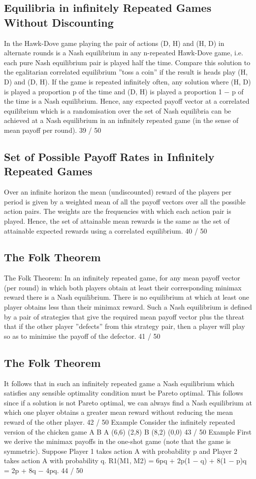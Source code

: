 \documentclass[]{report}
\begin{document}
\subsection{Equilibria in infinitely Repeated Games Without Discounting}
In the Hawk-Dove game playing the pair of actions (D, H) and
(H, D) in alternate rounds is a Nash equilibrium in any n-repeated
Hawk-Dove game, i.e. each pure Nash equilibrium pair is played
half the time.
Compare this solution to the egalitarian correlated equilibrium
”toss a coin” if the result is heads play (H, D) and (D, H).
If the game is repeated infinitely often, any solution where (H, D)
is played a proportion p of the time and (D, H) is played a
proportion 1 − p of the time is a Nash equilibrium.
Hence, any expected payoff vector at a correlated equilibrium
which is a randomisation over the set of Nash equilibria can be
achieved at a Nash equilibrium in an infinitely repeated game (in
the sense of mean payoff per round).
39 / 50
\subsection{Set of Possible Payoff Rates in Infinitely Repeated Games}
Over an infinite horizon the mean (undiscounted) reward of the
players per period is given by a weighted mean of all the payoff
vectors over all the possible action pairs. The weights are the
frequencies with which each action pair is played.
Hence, the set of attainable mean rewards is the same as the set of
attainable expected rewards using a correlated equilibrium.
40 / 50
\subsection{The Folk Theorem}
The Folk Theorem: In an infinitely repeated game, for any mean
payoff vector (per round) in which both players obtain at least
their corresponding minimax reward there is a Nash equilibrium.
There is no equilibrium at which at least one player obtains less
than their minimax reward.
Such a Nash equilibrium is defined by a pair of strategies that give
the required mean payoff vector plus the threat that if the other
player ”defects” from this strategy pair, then a player will play so
as to minimise the payoff of the defector.
41 / 50
\subsection{The Folk Theorem}
It follows that in such an infinitely repeated game a Nash
equilibrium which satisfies any sensible optimality condition must
be Pareto optimal.
This follows since if a solution is not Pareto optimal, we can always
find a Nash equilibrium at which one player obtains a greater mean
reward without reducing the mean reward of the other player.
42 / 50
Example
Consider the infinitely repeated version of the chicken game
A B
A (6,6) (2,8)
B (8,2) (0,0)
43 / 50
Example
First we derive the minimax payoffs in the one-shot game (note
that the game is symmetric).
Suppose Player 1 takes action A with probability p and Player 2
takes action A with probability q.
R1(M1, M2) = 6pq + 2p(1 − q) + 8(1 − p)q = 2p + 8q − 4pq.
44 / 50
\end{document}
